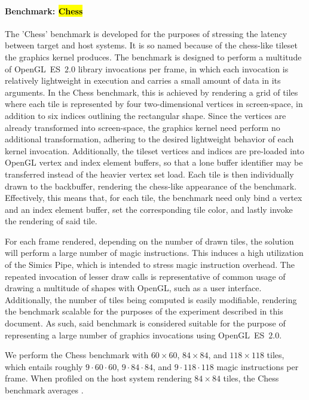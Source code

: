 \paragraph{Benchmark: \hl{Chess}}
\label{par:experimentalmethodology_benchmarking_benchmarkchess}
The 'Chess' benchmark is developed for the purposes of stressing the latency between target and host systems.
It is so named because of the chess-like tileset the graphics kernel produces.
The benchmark is designed to perform a multitude of OpenGL~ES~$2.0$ library invocations per frame, in which each invocation is relatively lightweight in execution and carries a small amount of data in its arguments.
In the Chess benchmark, this is achieved by rendering a grid of tiles where each tile is represented by four two-dimensional vertices in screen-space, in addition to six indices outlining the rectangular shape.
Since the vertices are already transformed into screen-space, the graphics kernel need perform no additional transformation, adhering to the desired lightweight behavior of each kernel invocation.
Additionally, the tileset vertices and indices are pre-loaded into OpenGL vertex and index element buffers, so that a lone buffer identifier may be transferred instead of the heavier vertex set load.
Each tile is then individually drawn to the backbuffer, rendering the chess-like appearance of the benchmark.
Effectively, this means that, for each tile, the benchmark need only bind a vertex and an index element buffer, set the corresponding tile color, and lastly invoke the rendering of said tile.

For each frame rendered, depending on the number of drawn tiles, the solution will perform a large number of magic instructions.
This induces a high utilization of the Simics Pipe, which is intended to stress magic instruction overhead.
The repeated invocation of lesser draw calls is representative of common usage of drawing a multitude of shapes with OpenGL, such as a user interface. Additionally, the number of tiles being computed is easily modifiable, rendering the benchmark scalable for the purposes of the experiment described in this document. As such, said benchmark is considered suitable for the purpose of representing a large number of graphics invocations using OpenGL~ES~$2.0$.

We perform the Chess benchmark with $60\times60$, $84\times84$, and $118\times118$ tiles, which entails roughly $9\cdot60\cdot60$, $9\cdot84\cdot84$, and $9\cdot118\cdot118$ magic instructions per frame.
When profiled on the host system rendering $84\times84$ tiles, the Chess benchmark averages  \milli\second .


